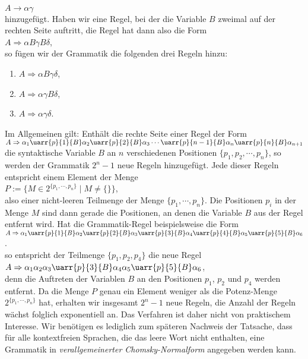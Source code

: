 \\[0.2cm]
\hspace*{1.3cm}
$A \rightarrow \alpha \gamma$
\\[0.2cm]
hinzugef\"ugt.  Haben wir eine Regel, bei der die Variable $B$ zweimal auf der rechten Seite auftritt, die
Regel hat dann also die Form
\\[0.2cm]
\hspace*{1.3cm}
$A \Rightarrow \alpha B \gamma B \delta$,
\\[0.2cm]
so f\"ugen wir der Grammatik die folgenden drei Regeln hinzu:
\begin{enumerate}
\item $A \Rightarrow \alpha B \gamma \delta$,
\item $A \Rightarrow \alpha \gamma B \delta$,
\item $A \Rightarrow \alpha \gamma \delta$.
\end{enumerate}
Im Allgemeinen gilt:  Enth\"alt die rechte Seite einer Regel der Form
\\[0.2cm]
\hspace*{1.3cm}
$A \Rightarrow \alpha_1 \uarr{p}{1}{B} \alpha_2 \uarr{p}{2}{B} \alpha_3 \cdots 
 \uarr{p}{n-1}{B} \alpha_n \uarr{p}{n}{B} \alpha_{n+1}$
\\[0.2cm]
die syntaktische Variable $B$ an $n$ verschiedenen Positionen $\{p_1, p_2, \cdots, p_n \}$, 
so werden der Grammatik $2^n - 1$ 
neue Regeln hinzugef\"ugt.  Jede dieser Regeln entspricht einem Element der Menge
\\[0.2cm]
\hspace*{1.3cm}
$P := \bigl\{ M \in 2^{\{p_1, \cdots, p_n\}} \mid M \not= \{\} \bigr\}$,
\\[0.2cm]
also einer nicht-leeren Teilmenge der Menge $\{ p_1, \cdots, p_n \}$.  
Die Positionen $p_i$ in der Menge  $M$ sind dann gerade die Positionen, an denen die Variable $B$ aus der
Regel entfernt wird.  Hat die Grammatik-Regel beispielsweise die Form
\\[0.2cm]
\hspace*{1.3cm}
$A \Rightarrow \alpha_1 \uarr{p}{1}{B} \alpha_2 \uarr{p}{2}{B} \alpha_3  \uarr{p}{3}{B} 
 \alpha_4 \uarr{p}{4}{B} \alpha_{5} \uarr{p}{5}{B} \alpha_{6}$.
\\[0.2cm]
so entspricht der Teilmenge $\{p_1,p_2, p_4\}$ die neue Regel
\\[0.2cm]
\hspace*{1.3cm}
$A \Rightarrow \alpha_1 \alpha_2 \alpha_3  \uarr{p}{3}{B} 
 \alpha_4 \alpha_{5} \uarr{p}{5}{B} \alpha_{6}$,
\\[0.2cm]
denn die Auftreten der Variablen $B$ an den Positionen $p_1$, $p_2$ und $p_4$ werden entfernt.
Da die Menge $P$ genau ein Element weniger als die Potenz-Menge $2^{\{p_1, \cdots, p_n\}}$ hat,
erhalten wir insgesamt $2^{n}-1$ neue Regeln, die Anzahl der Regeln w\"achst folglich exponentiell
an. Das Verfahren ist daher nicht von praktischem Interesse.  Wir ben\"otigen es lediglich zum sp\"ateren
Nachweis  der Tatsache, dass f\"ur alle kontextfreien Sprachen, die das leere Wort nicht enthalten,
eine Grammatik in \emph{verallgemeinerter Chomsky-Normalform} angegeben werden kann.


